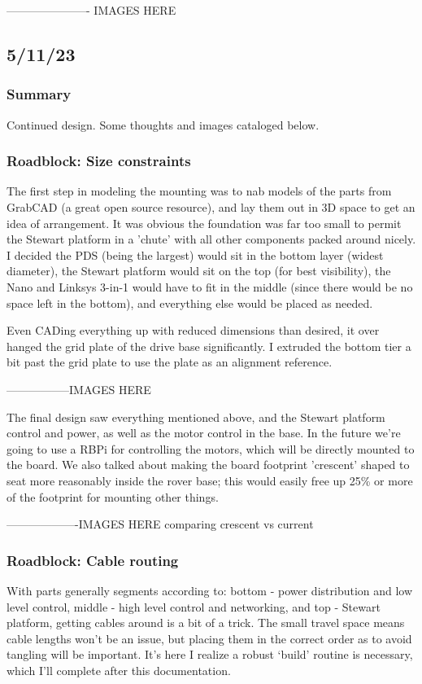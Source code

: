 \documentclass[a4paper, 10pt]{article}
\begin{document}
		---------------------- IMAGES HERE
		
	\subsection{5/11/23} 	
		\subsubsection{Summary}
		Continued design. Some thoughts and images cataloged below. 
		
		\subsubsection{Roadblock: Size constraints}	
		The first step in modeling the mounting was to nab models of the parts from GrabCAD (a great open source resource), and lay them out in 3D space to get an idea of arrangement. It was obvious the foundation was far too small to permit the Stewart platform in a 'chute' with all other components packed around nicely. I decided the PDS (being the largest) would sit in the bottom layer (widest diameter), the Stewart platform would sit on the top (for best visibility), the Nano and Linksys 3-in-1 would have to fit in the middle (since there would be no space left in the 	bottom), and everything else would be placed as needed.	
			
		Even CADing everything up with reduced dimensions than desired, it over hanged the grid plate of the drive base significantly. I extruded the bottom tier a bit past the grid plate to use the plate as an alignment reference.
		
		-----------------IMAGES HERE
			
		The final design saw everything mentioned above, and the Stewart platform control and power, as well as the motor control in the base. In the future we're going to use a RBPi for controlling the motors, which will be directly mounted to the board. We also talked about making the board footprint 'crescent' shaped to seat more reasonably inside the rover base; this would easily free up 25\% or more of the footprint for mounting other things.
		
		-------------------IMAGES HERE comparing crescent vs current
			
		\subsubsection{Roadblock: Cable routing}
		With parts generally segments according to: bottom - power distribution and low level control, middle - high level control and networking, and top - Stewart platform, getting cables around is a bit of a trick. The small travel space means cable lengths won't be an issue, but placing them in the correct order as to avoid tangling will be important. It's here I realize a robust `build' routine is necessary, which I'll complete after this documentation. 
		
\end{document}
